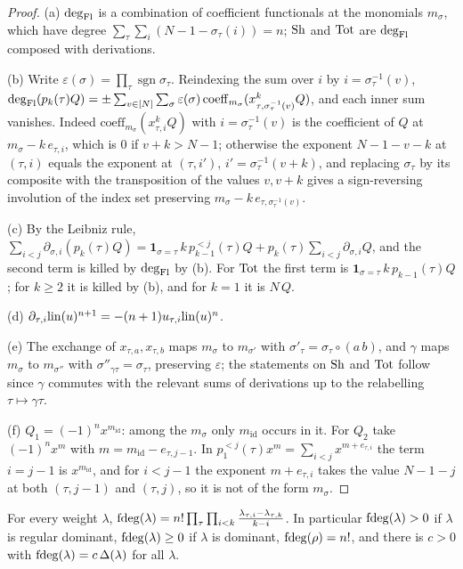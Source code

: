 \begin{proof}
(a) $\deg_{\mathrm{Fl}}$ is a combination of coefficient functionals at the monomials $m_\sigma$, which have degree
$\sum_\tau\sum_i(N-1-\sigma_\tau(i))=n$; $\mathrm{Sh}$ and $\mathrm{Tot}$ are $\deg_{\mathrm{Fl}}$ composed with
derivations.

(b) Write $\varepsilon(\sigma)=\prod_\tau\operatorname{sgn}\sigma_\tau$. Reindexing the sum over $i$ by
$i=\sigma_\tau^{-1}(v)$,
$\deg_{\mathrm{Fl}}(p_k(\tau)Q)=\pm\sum_{v\in[N]}\sum_\sigma\varepsilon(\sigma)\,
\mathrm{coeff}_{m_\sigma}(x_{\tau,\sigma_\tau^{-1}(v)}^kQ)$, and each inner sum vanishes. Indeed
$\mathrm{coeff}_{m_\sigma}(x_{\tau,i}^kQ)$ with $i=\sigma_\tau^{-1}(v)$ is the coefficient of $Q$ at
$m_\sigma-k\,e_{\tau,i}$, which is $0$ if $v+k>N-1$; otherwise the exponent $N-1-v-k$ at $(\tau,i)$ equals the
exponent at $(\tau,i')$, $i'=\sigma_\tau^{-1}(v+k)$, and replacing $\sigma_\tau$ by its composite with the
transposition of the values $v,v+k$ gives a sign-reversing involution of the index set preserving
$m_\sigma-k\,e_{\tau,\sigma_\tau^{-1}(v)}$.

(c) By the Leibniz rule,
$\sum_{i<j}\partial_{\sigma,i}(p_k(\tau)Q)=\mathbf 1_{\sigma=\tau}\,k\,p^{<j}_{k-1}(\tau)Q+
p_k(\tau)\sum_{i<j}\partial_{\sigma,i}Q$, and the second term is killed by $\deg_{\mathrm{Fl}}$ by (b). For
$\mathrm{Tot}$ the first term is $\mathbf 1_{\sigma=\tau}\,k\,p_{k-1}(\tau)Q$; for $k\ge2$ it is killed by (b),
and for $k=1$ it is $N\,Q$.

(d) $\partial_{\tau,i}\mathrm{lin}(u)^{n+1}=-(n+1)u_{\tau,i}\mathrm{lin}(u)^n$.

(e) The exchange of $x_{\tau,a},x_{\tau,b}$ maps $m_\sigma$ to $m_{\sigma'}$ with $\sigma'_\tau=\sigma_\tau\circ
(a\,b)$, and $\gamma$ maps $m_\sigma$ to $m_{\sigma''}$ with $\sigma''_{\gamma\tau}=\sigma_\tau$, preserving
$\varepsilon$; the statements on $\mathrm{Sh}$ and $\mathrm{Tot}$ follow since $\gamma$ commutes with the relevant
sums of derivations up to the relabelling $\tau\mapsto\gamma\tau$.

(f) $Q_1=(-1)^nx^{m_{\mathrm{id}}}$: among the $m_\sigma$ only $m_{\mathrm{id}}$ occurs in it. For $Q_2$ take
$(-1)^nx^{m}$ with $m=m_{\mathrm{id}}-e_{\tau,j-1}$. In $p_1^{<j}(\tau)x^m=\sum_{i<j}x^{m+e_{\tau,i}}$ the
term $i=j-1$ is $x^{m_{\mathrm{id}}}$, and for $i<j-1$ the exponent $m+e_{\tau,i}$ takes the value $N-1-j$ at
both $(\tau,j-1)$ and $(\tau,j)$, so it is not of the form $m_\sigma$.
\end{proof}

\begin{lemma}\label{pf:volthm:lem:weyl}
For every weight $\lambda$,
$\mathrm{fdeg}(\lambda)=n!\prod_\tau\prod_{i<k}\frac{\lambda_{\tau,i}-\lambda_{\tau,k}}{k-i}$. In particular
$\mathrm{fdeg}(\lambda)>0$ if $\lambda$ is regular dominant, $\mathrm{fdeg}(\lambda)\ge0$ if $\lambda$ is dominant,
$\mathrm{fdeg}(\rho)=n!$, and there is $c>0$ with $\mathrm{fdeg}(\lambda)=c\,\Delta(\lambda)$ for all $\lambda$.
\end{lemma}

